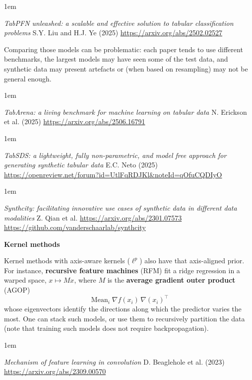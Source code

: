 \documentclass[a5paper]{article}
\let\d\textbf
\newenvironment{reference}{%
  \medskip\goodbreak
  \parskip 0pt
  \raggedright
  \leftskip 1em
  \obeylines
}{\par\medskip\goodbreak}
\def\subsection#1{{\par\bigskip\goodbreak\large\bfseries #1\par}}
\begin{document}
\begin{reference}
  \emph{TabPFN unleashed: a scalable and effective solution to tabular classification problems}
  S.Y. Liu and H.J. Ye (2025)
  \url{https://arxiv.org/abs/2502.02527}
\end{reference}

Comparing those models can be problematic: each paper tends to use different benchmarks,
the largest models may have seen some of the test data,
and synthetic data may present artefacts or (when based on resampling)
may not be general enough.

\begin{reference}
  \emph{TabArena: a living benchmark for machine learning on tabular data}
  N. Erickson et al. (2025)
  \url{https://arxiv.org/abs/2506.16791}
\end{reference}

\begin{reference}
  \emph{TabSDS: a lightweight, fully  non-parametric, and model free approach  for generating synthetic tabular data}
  E.C. Neto (2025)
  \url{https://openreview.net/forum?id=UtlFqRDJKl&noteId=qOfuCQDIyO}
\end{reference}

\begin{reference}
  \emph{Synthcity: facilitating innovative use cases  of synthetic data in different data modalities}
  Z. Qian et al.
  \url{https://arxiv.org/abs/2301.07573}
  \url{https://github.com/vanderschaarlab/synthcity}
\end{reference}

\subsection{Kernel methods}

Kernel methods with axis-aware kernels ($\ell^p$) also have that axis-aligned prior.
For instance, \d{recursive feature machines} (RFM)
fit a ridge regression in a warped space,
$x \mapsto Mx$,
where $M$ is the \d{average gradient outer product} (AGOP)
\[ \operatorname{Mean}_i \nabla f(x_i) \, \nabla(x_i)^\top \]
whose eigenvectors identify the directions along which the predictor varies the most.
One can stack such models,
or use them to recursively partition the data
(note that training such models does not require backpropagation).

\begin{reference}
  \emph{Mechanism of feature learning in convolution}
  D. Beaglehole et al. (2023)
  \url{https://arxiv.org/abs/2309.00570}
\end{reference}
\end{document}
